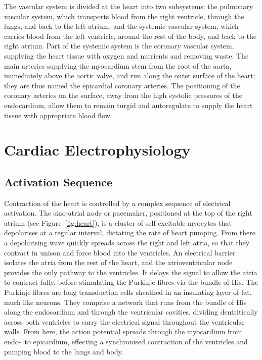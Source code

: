   The vascular system is divided at the heart into two subsystems: the pulmonary vascular system, which transports blood from the right ventricle, through the lungs, and back to the left atrium; and the systemic vascular system, which carries blood from the left ventricle, around the rest of the body, and back to the right atrium. Part of the systemic system is the coronary vascular system, supplying the heart tissue with oxygen and nutrients and removing waste. The main arteries supplying the myocardium stem from the root of the aorta, immediately above the aortic valve, and run along the outer surface of the heart; they are thus named the epicardial coronary arteries. The positioning of the coronary arteries on the surface, away from the high systolic pressures of the endocardium, allow them to remain turgid and autoregulate to supply the heart tissue with appropriate blood flow.

\section{Cardiac Electrophysiology}
\label{sec:electrophysiology}
  \subsection{Activation Sequence}
  \label{sub:activation_sequence}
    Contraction of the heart is controlled by a complex sequence of electrical activation. The sino-atrial node or pacemaker, positioned at the top of the right atrium (see Figure~\ref{fig:heart}), is a cluster of self-excitable myocytes that depolarises at a regular interval, dictating the rate of heart pumping. From there a depolarising wave quickly spreads across the right and left atria, so that they contract in unison and force blood into the ventricles. An electrical barrier isolates the atria from the rest of the heart, and the atrioventricular node provides the only pathway to the ventricles. It delays the signal to allow the atria to contract fully, before stimulating the Purkinje fibres via the bundle of His. The Purkinje fibres are long transduction cells sheathed in an insulating layer of fat, much like neurons. They comprise a network that runs from the bundle of His along the endocardium and through the ventricular cavities, dividing dentritically across both ventricles to carry the electrical signal throughout the ventricular walls. From here, the action potential spreads through the myocardium from endo-~to epicardium, effecting a synchronised contraction of the ventricles and pumping blood to the lungs and body.
    
